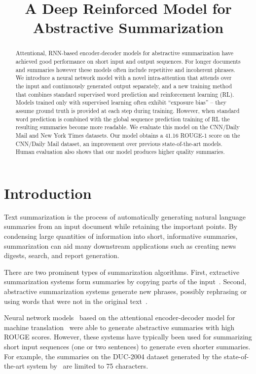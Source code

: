 \title{A Deep Reinforced Model for Abstractive Summarization}

\begin{abstract}
Attentional, RNN-based encoder-decoder models for abstractive summarization have achieved good performance on short input and output sequences. For longer documents and summaries however these models often include repetitive and incoherent phrases. We introduce a neural network model with a novel intra-attention that attends over the input and continuously generated output separately, and a new training method that combines standard supervised word prediction and reinforcement learning (RL). Models trained only with supervised learning often exhibit ``exposure bias'' -- they assume ground truth is provided at each step during training. However, when standard word prediction is combined with the global sequence prediction training of RL the resulting summaries become more readable. We evaluate this model on the CNN/Daily Mail and New York Times datasets. Our model obtains a 41.16 ROUGE-1 score on the CNN/Daily Mail dataset, an improvement over previous state-of-the-art models. Human evaluation also shows that our model produces higher quality summaries.
\end{abstract}

\section{Introduction}

Text summarization is the process of automatically generating natural language summaries from an input document while retaining the important points. By condensing large quantities of information into short, informative summaries, summarization can aid many downstream applications such as creating news digests, search, and report generation.

There are two prominent types of summarization algorithms. First, extractive summarization systems form summaries by copying parts of the input~\citep{dorr2003,nallapati2017}. Second, abstractive summarization systems generate new phrases, possibly rephrasing or using words that were not in the original text~\citep{chopra2016,nallapati2016}.

Neural network models~\citep{nallapati2016} based on the attentional encoder-decoder model for machine translation~\citep{bahdanau2014} were able to generate abstractive summaries with high ROUGE scores. However, these systems have typically been used for summarizing short input sequences (one or two sentences) to generate even shorter summaries. For example, the summaries on the DUC-2004 dataset generated by the state-of-the-art system  by~\citet{zeng2016} are limited to 75 characters.

